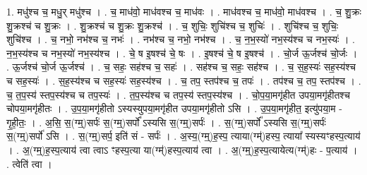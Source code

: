 \documentclass[17pt]{extarticle}
\begin{document}
1. मधु॑श्च च॒ मधु॒र् मधु॑श्च । . च॒ माध॑वो॒ माध॑वश्च च॒ माध॑वः । . माध॑वश्च च॒ माध॑वो॒ माध॑वश्च । . च॒ शु॒क्रः शु॒क्रश्च॑ च शु॒क्रः । . शु॒क्रश्च॑ च शु॒क्रः शु॒क्रश्च॑ । . च॒ शुचिः॒ शुचि॑श्च च॒ शुचिः॑ । . शुचि॑श्च च॒ शुचिः॒ शुचि॑श्च । . च॒ नभो॒ नभ॑श्च च॒ नभः॑ । . नभ॑श्च च॒ नभो॒ नभ॑श्च । . च॒ न॒भ॒स्यो॑ नभ॒स्य॑श्च च नभ॒स्यः॑ । . न॒भ॒स्य॑श्च च नभ॒स्यो॑ नभ॒स्य॑श्च । . चे॒ ष इ॒षश्च॑ चे॒ षः । . इ॒षश्च॑ चे॒ ष इ॒षश्च॑ । . चो॒र्ज ऊ॒र्जश्च॑ चो॒र्जः । . ऊ॒र्जश्च॑ चो॒र्ज ऊ॒र्जश्च॑ । . च॒ सहः॒ सह॑श्च च॒ सहः॑ । . सह॑श्च च॒ सहः॒ सह॑श्च । . च॒ स॒ह॒स्यः॑ सह॒स्य॑श्च च सह॒स्यः॑ । . स॒ह॒स्य॑श्च च सह॒स्यः॑ सह॒स्य॑श्च । . च॒ तप॒ स्तप॑श्च च॒ तपः॑ । . तप॑श्च च॒ तप॒ स्तप॑श्च । . च॒ त॒प॒स्य॑ स्तप॒स्य॑श्च च तप॒स्यः॑ । . त॒प॒स्य॑श्च च तप॒स्य॑ स्तप॒स्य॑श्च । . चो॒प॒या॒मगृ॑हीत उपया॒मगृ॑हीतश्च चोपया॒मगृ॑हीतः । . उ॒प॒या॒मगृ॑हीतो ऽस्यस्युपया॒मगृ॑हीत उपया॒मगृ॑हीतो ऽसि । . उ॒प॒या॒मगृ॑हीत॒ इत्यु॑पया॒म - गृ॒ही॒तः॒ । . अ॒सि॒ स॒(ग्म्॒)सर्पः॑ स॒(ग्म्॒)सर्पो᳚ ऽस्यसि स॒(ग्म्॒)सर्पः॑ । . स॒(ग्म्॒)सर्पो᳚ ऽस्यसि स॒(ग्म्॒)सर्पः॑ स॒(ग्म्॒)सर्पो॑ ऽसि । . स॒(ग्म्॒)सर्प॒ इति॑ सं - सर्पः॑ । . अ॒स्य॒(ग्म्॒)ह॒स्प॒ त्याया(ग्म्॑)हस्प॒ त्याया᳚ स्यस्यꣳहस्प॒त्याय॑ । . अ॒(ग्म्॒)ह॒स्प॒त्याय॑ त्वा त्वाऽ ꣳहस्प॒त्या या(ग्म्॑)हस्प॒त्याय॑ त्वा । . अ॒(ग्म्॒)ह॒स्प॒त्यायेत्य(ग्म्॑)हः - प॒त्याय॑ । . त्वेति॑ त्वा । \newline
\end{document}
